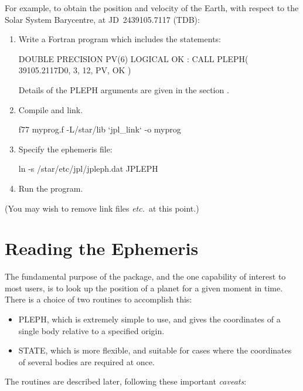 \documentclass[twoside,11pt,nolof]{starlink}
\begin{document}
For example, to obtain the position and velocity of the Earth, with
respect to the Solar System Barycentre, at JD~2439105.7117 (TDB):

\begin{enumerate}
\item Write a Fortran program which includes the statements:
\begin{small}
\begin{terminalv}
DOUBLE PRECISION PV(6)
LOGICAL OK
   :
CALL PLEPH( 39105.2117D0, 3, 12, PV, OK )
\end{terminalv}
\end{small}

Details of the PLEPH arguments are given
%
{in the section .}

\item Compile and link.
\begin{terminalv}
f77 myprog.f -L/star/lib `jpl_link` -o myprog
\end{terminalv}
\item Specify the ephemeris file:
\begin{terminalv}
ln -s /star/etc/jpl/jpleph.dat JPLEPH
\end{terminalv}
\item Run the program.

\end{enumerate}
(You may wish to remove link files \emph{etc.}\ at this point.)

\section{Reading the Ephemeris}
\label{reading_the_ephemeris}

The fundamental purpose of the package, and the one capability
of interest to most users, is to look up the position of
a planet for a given moment in time.
There is a choice of two routines to accomplish this:
\begin{itemize}
\item PLEPH, which is extremely simple to use, and gives
the coordinates of a single body relative to a specified
origin.
\item STATE, which is more flexible, and suitable for
cases where the coordinates
of several bodies are required at once.
\end{itemize}
The routines are described later, following these
important \textit{caveats}\/:
\end{document}
